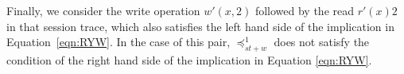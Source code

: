 \documentclass[journal,compsoc]{IEEEtran}
\begin{document}
  Finally, we consider the write operation $w'(x,2)$  followed by the read $r'(x){2}$ in that session trace, which also satisfies the left hand side of the implication in Equation~\ref{eqn:RYW}. %
    In the case of this pair, $\preccurlyeq_{\mathit{st}+w}^1$ does not satisfy the condition 
of the right hand side of the implication in Equation  \ref{eqn:RYW}.  %
\end{document}

